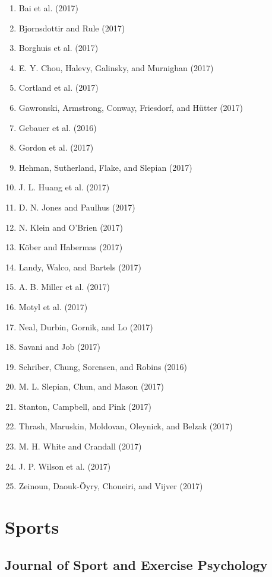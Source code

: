 \documentclass[english,man]{apa6}
\providecommand{\tightlist}{%
  \setlength{\itemsep}{0pt}\setlength{\parskip}{0pt}}
\theoremstyle{definition}
\theoremstyle{definition}
\theoremstyle{definition}
\theoremstyle{remark}
\begin{document}
\begin{enumerate}
\def\labelenumi{\arabic{enumi})}
\tightlist
\item
  Bai et al. (2017)
\item
  Bjornsdottir and Rule (2017)
\item
  Borghuis et al. (2017)
\item
  E. Y. Chou, Halevy, Galinsky, and Murnighan (2017)
\item
  Cortland et al. (2017)
\item
  Gawronski, Armstrong, Conway, Friesdorf, and Hütter (2017)
\item
  Gebauer et al. (2016)
\item
  Gordon et al. (2017)
\item
  Hehman, Sutherland, Flake, and Slepian (2017)
\item
  J. L. Huang et al. (2017)
\item
  D. N. Jones and Paulhus (2017)
\item
  N. Klein and O'Brien (2017)
\item
  Köber and Habermas (2017)
\item
  Landy, Walco, and Bartels (2017)
\item
  A. B. Miller et al. (2017)
\item
  Motyl et al. (2017)
\item
  Neal, Durbin, Gornik, and Lo (2017)
\item
  Savani and Job (2017)
\item
  Schriber, Chung, Sorensen, and Robins (2016)
\item
  M. L. Slepian, Chun, and Mason (2017)
\item
  Stanton, Campbell, and Pink (2017)
\item
  Thrash, Maruskin, Moldovan, Oleynick, and Belzak (2017)
\item
  M. H. White and Crandall (2017)
\item
  J. P. Wilson et al. (2017)
\item
  Zeinoun, Daouk-Öyry, Choueiri, and Vijver (2017)
\end{enumerate}

\section{Sports}\label{sports}

\subsection{Journal of Sport and Exercise
Psychology}\label{journal-of-sport-and-exercise-psychology}
\end{document}
